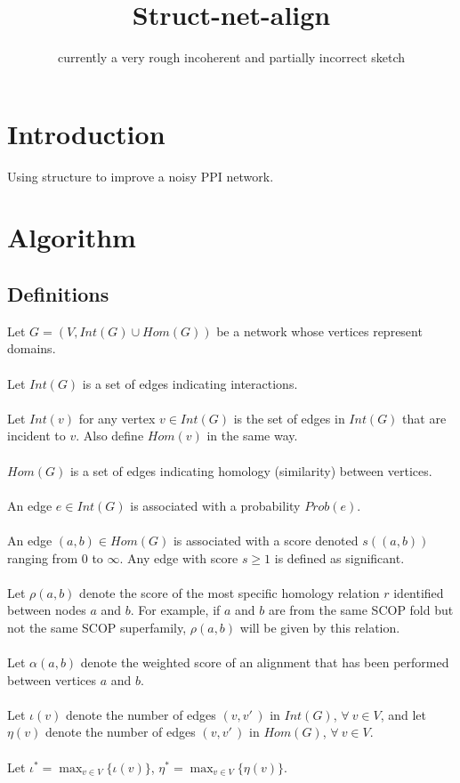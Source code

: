 \documentclass[11pt]{article}
\title{\textbf{Struct-net-align}}
\date{currently a very rough incoherent and partially incorrect sketch}
\begin{document}
\maketitle

\section*{Introduction}
Using structure to improve a noisy PPI network.

\section*{Algorithm}

\subsection*{Definitions}

Let $G = (V,Int(G) \cup Hom(G))$ be a network whose vertices represent domains.\\\\
Let $Int(G)$ is a set of edges indicating interactions.\\\\
Let $Int(v)$ for any vertex $v \in Int(G)$ is the set of edges in $Int(G)$ that are incident to $v$. Also define $Hom(v)$ in the same way.\\\\
$Hom(G)$ is a set of edges indicating homology (similarity) between vertices.\\\\
An edge $e \in Int(G)$ is associated with a probability $Prob(e)$.\\\\
An edge $(a,b) \in Hom(G)$ is associated with a score denoted $s((a,b))$ ranging from $0$ to $\infty$. Any edge with score $s \geq 1$ is defined as significant.\\\\
Let $\rho(a,b)$ denote the score of the most specific homology relation $r$ identified between nodes $a$ and $b$. For example, if $a$ and $b$ are from the same SCOP fold but not the same SCOP superfamily, $\rho(a,b)$ will be given by this relation.\\\\
Let $\alpha(a,b)$ denote the weighted score of an alignment that has been performed between vertices $a$ and $b$.\\\\
Let $\iota(v)$ denote the number of edges $(v, v'\,\!)$ in $Int(G)$, $\forall \: v \in V$, and let $\eta(v)$ denote the number of edges $(v, v'\,\!)$ in $Hom(G)$, $\forall \: v \in V$.\\\\
Let $\iota^* = \displaystyle \max_{v \in V}\{\iota(v)\}$, $\eta^* = \displaystyle \max_{v \in V}\{\eta(v)\}$.
\end{document}
